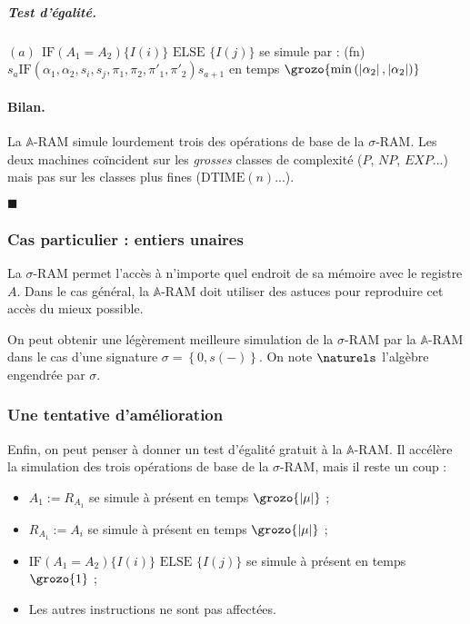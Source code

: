 \documentclass{report}
\newcommand{\sRAMifc}[2]{\text{IF} (A_1=A_2) \{I( #1 )\} \text{ ELSE } \{I( #2 )\}}
\newcommand{\bbA}{\mathbb{A}}
\begin{document}
\begin{demo}
						\subparagraph{Test d'égalité.}
						$(a) \:\: \sRAMifc{i}{j}$ se simule par : (fn) $s_a \text{IF}\left( \alpha_1, \alpha_2, s_i, s_j, \pi_1, \pi_2, \pi'_1, \pi'_2 \right) s_{a+1}$ en temps $\grozo{\min\left( \left| \alpha_2\right|, \left| \alpha_2 \right| \right)}$
						
						
					\paragraph{Bilan.}
					La $\bbA$-RAM simule lourdement trois des opérations de base de la $\sigma$-RAM. Les deux machines coïncident sur les \emph{grosses} classes de complexité ($P$, $NP$, $EXP$...) mais pas sur les classes plus fines ($\text{DTIME}(n)$...).
						
					$\blacksquare$
				\end{demo}
				
				
				
				
				\subsubsection{Cas particulier : entiers unaires}
				\label{subsubsec:sim_succ_RAM_N_RAM}
							
				La $\sigma$-RAM permet l'accès à n'importe quel endroit de sa mémoire avec le registre $A$. Dans le cas général, la $\bbA$-RAM doit utiliser des astuces pour reproduire cet accès du mieux possible. 
				
				
				On peut obtenir une légèrement meilleure simulation de la $\sigma$-RAM par la $\bbA$-RAM dans le cas d'une signature $\sigma = \left\lbrace 0, s(-)\right\rbrace$. On note $\naturels$ l'algèbre engendrée par $\sigma$.
	
	
	
				\subsubsection{Une tentative d'amélioration}
				\label{subsubsec:sim_amelioration}
				
				Enfin, on peut penser à donner un test d'égalité gratuit à la $\bbA$-RAM. Il accélère la simulation des trois opérations de base de la $\sigma$-RAM, mais il reste un coup : 
				
				\begin{itemize}[itemsep=-1mm]
					\item 	$A_1 := R_{A_1}$ se simule à présent en temps $\grozo{\left| \mu \right|}$ ;
					\item 	$R_{A_1} := A_i$ se simule à présent en temps $\grozo{\left| \mu \right|}$ ;
					\item 	$\sRAMifc{i}{j}$ se simule à présent en temps $\grozo{1}$ ;
					\item 	Les autres instructions ne sont pas affectées.
				\end{itemize}
				
\end{document}
